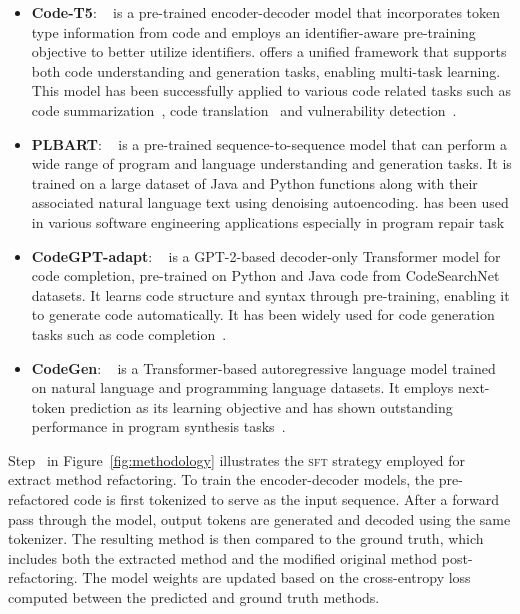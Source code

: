 \begin{itemize}
    \item \textbf{Code-T5}: \codetf{}~\cite{wang2021codet5identifierawareunifiedpretrained} is a pre-trained encoder-decoder model that incorporates token type information from code and employs an identifier-aware pre-training objective to better utilize identifiers. \codetf{} offers a unified framework that supports both code understanding and generation tasks, enabling multi-task learning. 
    This model has been successfully applied to various code related tasks such as code summarization~\cite{al2023extending, gu2022assemble}, code translation~\cite{kusum2022unsupervised} and vulnerability detection~\cite{paul2023, hou2024largelanguagemodelssoftware}.

    \item \textbf{PLBART}: \plbart{}~\cite{ahmad2021} 
    is a pre-trained sequence-to-sequence model that can perform a wide range of program and language understanding and generation tasks. It is trained on a large dataset of Java and Python functions along with their associated natural language text using denoising autoencoding. 
    \plbart{} has been used in various software engineering applications especially in program repair task~\cite{paul2023, wu2023effective}

    \item \textbf{CodeGPT-adapt}: \codegpt{}~\cite{lu2021codexgluemachinelearningbenchmark} is a GPT-2-based decoder-only Transformer model for code completion, pre-trained on Python and Java code from CodeSearchNet datasets. It learns code structure and syntax through pre-training, enabling it to generate code automatically.
    It has been widely used for code generation tasks such as code completion~\cite{li2024ircoco, hou2024largelanguagemodelssoftware}.

    \item \textbf{CodeGen}: \codegen{}~\cite{nijkamp2022codegen} is a Transformer-based autoregressive language model trained on natural language and programming language datasets. It employs next-token prediction as its learning objective and has shown outstanding performance in program synthesis tasks~\cite{christopoulou2022pangu}.

\end{itemize}

Step~ in Figure~\ref{fig:methodology} illustrates the \textsc{sft} strategy employed for extract method refactoring. To train the encoder-decoder models, the pre-refactored code is first tokenized to serve as the input sequence. After a forward pass through the model, output tokens are generated and decoded using the same tokenizer. The resulting method is then compared to the ground truth, which includes both the extracted method and the modified original method post-refactoring. The model weights are updated based on the cross-entropy loss computed between the predicted and ground truth methods.

